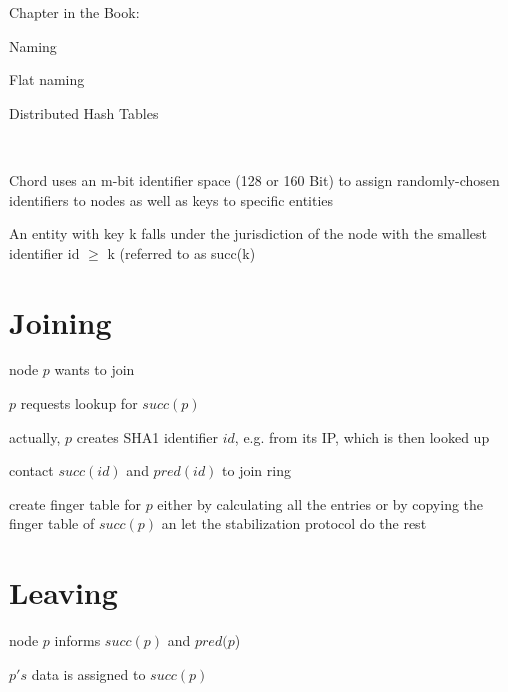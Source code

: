 \documentclass[ngerman,a4paper]{report}
\begin{document}
Chapter in the Book:
\begin{compactitem}
\item Naming
\begin{compactitem}
\item Flat naming
\begin{compactitem}
\item Distributed Hash Tables
\end{compactitem}
\end{compactitem}
\end{compactitem}
\ \\
\begin{compactitem}
\item Chord uses an m-bit identifier space (128 or 160 Bit) to assign randomly-chosen identifiers to nodes as well as keys to specific entities
\item An entity with key k falls under the jurisdiction of the node with the smallest identifier id $\geq$ k (referred to as succ(k)
\end{compactitem}

\section{Joining}
\begin{compactitem}
\item node $p$ wants to join
\item $p$ requests lookup for $succ(p)$  
\begin{compactitem}
\item actually, $p$ creates SHA1 identifier $id$, e.g. from its IP, which is then looked up
\end{compactitem}
\item contact $succ(id)$ and $pred(id)$ to join ring
\item create finger table for $p$ either by calculating all the entries or by copying the finger table of $succ(p)$ an let the stabilization protocol do the rest
\end{compactitem}

\section{Leaving}
\begin{compactitem}
\item node $p$ informs $succ(p)$ and $pred(p$)
\item $p's$ data is assigned to $succ(p)$
\end{compactitem}
\end{document}
